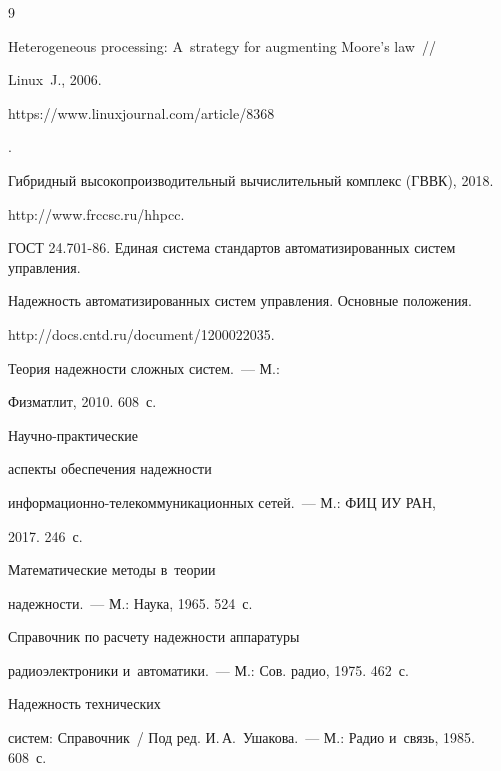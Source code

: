    {\small\frenchspacing

{%


\begin{thebibliography}{9}


 Heterogeneous processing: A~strategy for augmenting Moore's law~/\!\!/

Linux~J., 2006. {\sf 

https://www.linuxjournal.com/article/8368}.



Гибридный высокопроизводительный вычислительный комплекс (\mbox{ГВВК}), 2018. {\sf 

http://www.frccsc.ru/hhpcc.}


ГОСТ 24.701-86. Единая система стандартов автоматизированных систем управления. 

Надежность автоматизированных систем управления. Основные положения. {\sf 

http://docs.cntd.ru/document/1200022035.}




 Теория надежности сложных систем.~--- М.: 

Физматлит, 2010. 608~с.


 На\-уч\-но-прак\-ти\-че\-ские 

аспекты обеспечения надежности  

ин\-фор\-ма\-ци\-он\-но-те\-ле\-ком\-му\-ни\-ка\-ци\-он\-ных сетей.~--- М.: ФИЦ ИУ РАН, 

2017. 246~с.


 Математические методы в~теории 

надежности.~--- М.: Наука, 1965. 524~с.


 Справочник по расчету надежности аппаратуры 

радиоэлектроники и~автоматики.~--- М.: Сов. радио, 1975. 462~с.


 Надежность технических 

систем: Справочник~/ Под ред. И.\,А.~Ушакова.~--- М.: Радио и~связь, 1985. 608~с.

        \end{thebibliography}

} }





